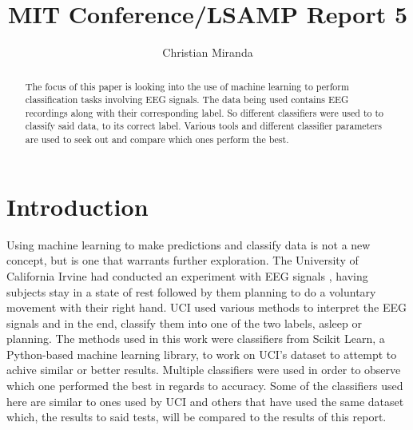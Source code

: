 \documentclass{report}
\begin{document}
\author{Christian Miranda}
\title{MIT Conference/LSAMP Report 5}
\maketitle

\begin{abstract}
The focus of this paper is looking into the use of machine learning to perform classification tasks involving EEG signals.
The data being used contains EEG recordings along with their corresponding label. So different classifiers were used to 
to classify said data, to its correct label. Various tools and different classifier parameters are used to seek 
out and compare which ones perform the best. 
\end{abstract}

\section{Introduction}
Using machine learning to make predictions and classify data is not a new concept, but is one that warrants further exploration. 
The University of California Irvine had conducted an experiment with EEG signals \cite{classsvm}, having subjects stay in a state of rest followed by them planning to do a voluntary movement with their right hand. 
UCI used various methods to interpret the EEG signals and 
in the end, classify them into one of the two labels, asleep or planning. The methods used in this work were classifiers from 
Scikit Learn, a Python-based machine learning library, to work on UCI's dataset to attempt to achive similar or better results. Multiple classifiers were used in order to observe which one performed the best in regards 
to accuracy. Some of the classifiers used here are similar to ones used by UCI and others that have used the same dataset \cite{fuzzy} which, the results to said tests, will be compared to the results of this report.
\end{document}
